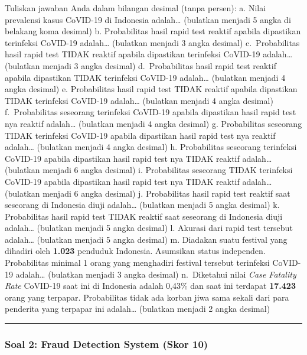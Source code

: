 \documentclass[
  letterpaper,
  DIV=11,
  numbers=noendperiod]{scrartcl}
\begin{document}
Tuliskan jawaban Anda dalam bilangan desimal (tanpa persen): a. Nilai
prevalensi kasus CoVID-19 di Indonesia adalah\ldots{} (bulatkan menjadi
5 angka di belakang koma desimal) b. Probabilitas hasil rapid test
reaktif apabila dipastikan terinfeksi CoVID-19 adalah\ldots{} (bulatkan
menjadi 3 angka desimal) c.~Probabilitas hasil rapid test TIDAK reaktif
apabila dipastikan terinfeksi CoVID-19 adalah\ldots{} (bulatkan menjadi
3 angka desimal) d.~Probabilitas hasil rapid test reaktif apabila
dipastikan TIDAK terinfeksi CoVID-19 adalah\ldots{} (bulatkan menjadi 4
angka desimal) e. Probabilitas hasil rapid test TIDAK reaktif apabila
dipastikan TIDAK terinfeksi CoVID-19 adalah\ldots{} (bulatkan menjadi 4
angka desimal) f.~Probabilitas seseorang terinfeksi CoVID-19 apabila
dipastikan hasil rapid test nya reaktif adalah\ldots{} (bulatkan menjadi
4 angka desimal) g. Probabilitas seseorang TIDAK terinfeksi CoVID-19
apabila dipastikan hasil rapid test nya reaktif adalah\ldots{} (bulatkan
menjadi 4 angka desimal) h. Probabilitas seseorang terinfeksi CoVID-19
apabila dipastikan hasil rapid test nya TIDAK reaktif adalah\ldots{}
(bulatkan menjadi 6 angka desimal) i. Probabilitas seseorang TIDAK
terinfeksi CoVID-19 apabila dipastikan hasil rapid test nya TIDAK
reaktif adalah\ldots{} (bulatkan menjadi 6 angka desimal) j.
Probabilitas hasil rapid test reaktif saat seseorang di Indonesia diuji
adalah\ldots{} (bulatkan menjadi 5 angka desimal) k. Probabilitas hasil
rapid test TIDAK reaktif saat seseorang di Indonesia diuji
adalah\ldots{} (bulatkan menjadi 5 angka desimal) l. Akurasi dari rapid
test tersebut adalah\ldots{} (bulatkan menjadi 5 angka desimal) m.
Diadakan suatu festival yang dihadiri oleh \textbf{1.023} penduduk
Indonesia. Asumsikan status independen. Probabilitas minimal 1 orang
yang menghadiri festival tersebut terinfeksi CoVID-19 adalah\ldots{}
(bulatkan menjadi 3 angka desimal) n.~Diketahui nilai \emph{Case
Fatality Rate} CoVID-19 saat ini di Indonesia adalah 0,43\% dan saat ini
terdapat \textbf{17.423} orang yang terpapar. Probabilitas tidak ada
korban jiwa sama sekali dari para penderita yang terpapar ini
adalah\ldots{} (bulatkan menjadi 2 angka desimal)

\begin{center}\rule{0.5\linewidth}{0.5pt}\end{center}

\subsubsection{\texorpdfstring{\textbf{Soal 2: Fraud Detection System
(Skor
10)}}{Soal 2: Fraud Detection System (Skor 10)}}\label{soal-2-fraud-detection-system-skor-10}
\end{document}
